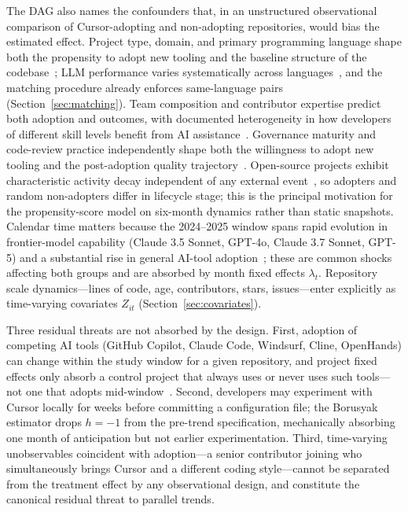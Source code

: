 The DAG also names the confounders that, in an unstructured observational comparison of Cursor-adopting and non-adopting repositories, would bias the estimated effect.
Project type, domain, and primary programming language shape both the propensity to adopt new tooling and the baseline structure of the codebase~\cite{DBLP:journals/corr/abs-2410-02091, daniotti2025using}; LLM performance varies systematically across languages~\cite{DBLP:journals/pacmpl/CassanoGLSFAF0J24, DBLP:journals/corr/abs-2503-17181}, and the matching procedure already enforces same-language pairs (Section~\ref{sec:matching}).
Team composition and contributor expertise predict both adoption and outcomes, with documented heterogeneity in how developers of different skill levels benefit from AI assistance~\cite{DBLP:journals/jss/DakhelMNKDJ23, DBLP:journals/corr/abs-2302-06590, cui2025effects}.
Governance maturity and code-review practice independently shape both the willingness to adopt new tooling and the post-adoption quality trajectory~\cite{DBLP:conf/sigsoft/ChengMCJGKZ022, besker2018technical}.
Open-source projects exhibit characteristic activity decay independent of any external event~\cite{DBLP:journals/ese/KalliamvakouGBS16, DBLP:journals/corr/abs-2412-13459, DBLP:journals/ese/MunaiahKCN17}, so adopters and random non-adopters differ in lifecycle stage; this is the principal motivation for the propensity-score model on six-month dynamics rather than static snapshots.
Calendar time matters because the 2024--2025 window spans rapid evolution in frontier-model capability (Claude 3.5 Sonnet, GPT-4o, Claude 3.7 Sonnet, GPT-5) and a substantial rise in general AI-tool adoption~\cite{stackoverflow-survey-ai, daniotti2025using, DBLP:journals/corr/abs-2507-09089, kumar2025intuition}; these are common shocks affecting both groups and are absorbed by month fixed effects $\lambda_t$.
Repository scale dynamics---lines of code, age, contributors, stars, issues---enter explicitly as time-varying covariates $Z_{it}$ (Section~\ref{sec:covariates}).

Three residual threats are not absorbed by the design.
First, adoption of competing AI tools (GitHub Copilot, Claude Code, Windsurf, Cline, OpenHands) can change within the study window for a given repository, and project fixed effects only absorb a control project that always uses or never uses such tools---not one that adopts mid-window~\cite{DBLP:journals/corr/abs-2507-09089, watanabe2025use, kumar2025intuition}.
Second, developers may experiment with Cursor locally for weeks before committing a configuration file; the Borusyak estimator drops $h=-1$ from the pre-trend specification, mechanically absorbing one month of anticipation but not earlier experimentation.
Third, time-varying unobservables coincident with adoption---a senior contributor joining who simultaneously brings Cursor and a different coding style---cannot be separated from the treatment effect by any observational design, and constitute the canonical residual threat to parallel trends.

